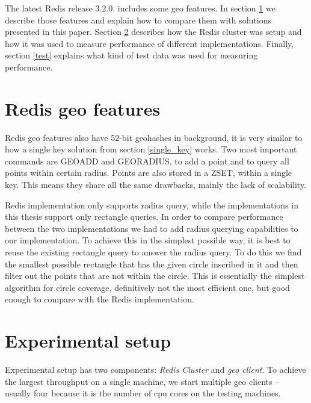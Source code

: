 \documentclass[times, utf8, diplomski]{fer}
\begin{document}
The latest Redis release 3.2.0. includes some geo features. In section \ref{redis_geo} we describe those features and explain how to compare them with solutions presented in this paper. Section \ref{setup} describes how the Redis cluster was setup and how it was used to measure performance of different implementations. Finally, section \ref{test} explains what kind of test data was used for measuring performance.

\section {Redis geo features} \label{redis_geo}
Redis geo features also have 52-bit geohashes in background, it is very similar to how a single key solution from section \ref{single_key} works. Two most important commands are GEOADD and GEORADIUS, to add a point and to query all points within certain radius. Points are also stored in a ZSET, within a single key. This means they share all the same drawbacks, mainly the lack of scalability.

Redis implementation only supports radius query, while the implementations in this thesis support only rectangle queries. In order to compare performance between the two implementations we had to add radius querying capabilities to our implementation. To achieve this in the simplest possible way, it is best to reuse the existing rectangle query to answer the radius query. To do this we find the smallest possible rectangle that has the given circle inscribed in it and then filter out the points that are not within the circle. This is essentially the simplest algorithm for circle coverage, definitively not the most efficient one, but good enough to compare with the Redis implementation.

\section {Experimental setup} \label{setup}
Experimental setup has two components: \emph{Redis Cluster} and \emph{geo client}.
To achieve the largest throughput on a single machine, we start multiple geo clients -- usually four because it is the number of cpu cores on the testing machines.
\end{document}
